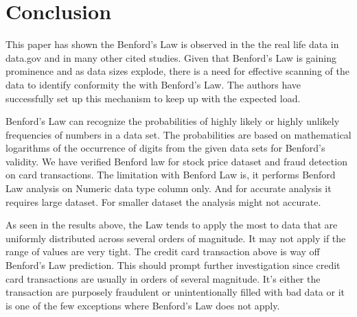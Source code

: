 \section{Conclusion}
This paper has shown the Benford’s Law is observed in 
the the real life data in data.gov and in many other 
cited studies. Given that Benford’s Law is gaining prominence 
and as data sizes explode, there is a need for effective scanning
of the data to identify conformity the with Benford’s Law. 
The authors have successfully set up this mechanism to 
keep up with the expected load.


Benford’s Law can recognize the probabilities of highly  
likely or highly unlikely frequencies of numbers in a data set.
The probabilities are based on mathematical logarithms of the 
occurrence of digits from the given data sets for Benford's 
validity. We have verified Benford law for stock price 
dataset and fraud detection on card transactions.
The limitation with Benford Law is, it performs 
Benford Law analysis on Numeric data type column only. 
And for accurate analysis it requires large dataset. 
For smaller dataset the analysis might not accurate.

As seen in the results above, the Law tends to 
apply the most to data that are uniformly 
distributed across several orders of magnitude. 
It may not apply if the range of values are 
very tight. The credit card transaction above 
is way off Benford’s Law prediction. 
This should prompt further investigation 
since credit card transactions are usually 
in orders of several magnitude. 
It’s either the transaction are purposely 
fraudulent or unintentionally filled 
with bad data or it is one of 
the few exceptions where Benford’s Law does not apply.



 
